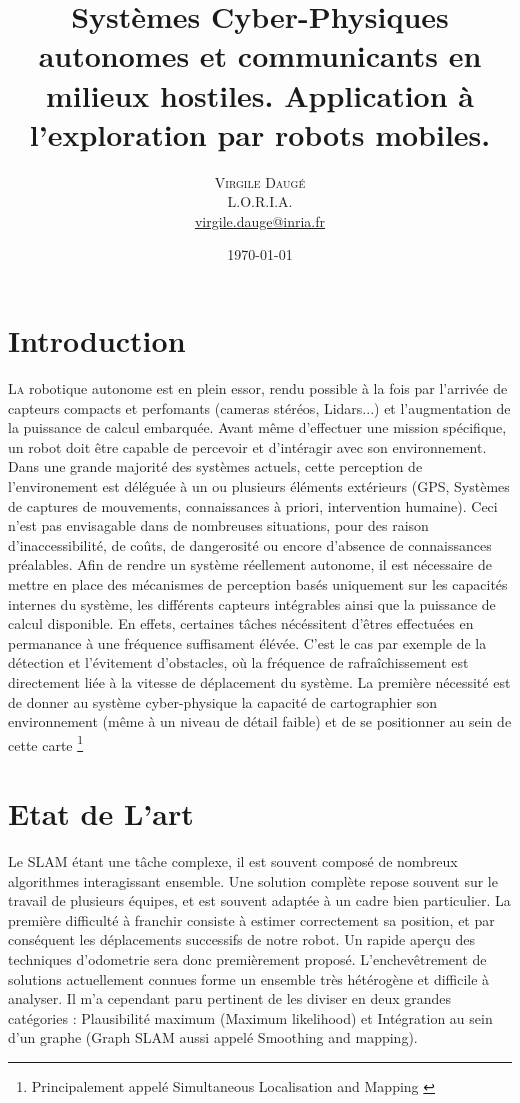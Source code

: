 \documentclass[twoside,twocolumn]{article}
\title{Systèmes Cyber-Physiques autonomes et communicants en milieux hostiles. Application à l’exploration par robots mobiles. } %
\author{%
\textsc{Virgile Daugé} \\[1ex] %
\normalsize L.O.R.I.A. \\ %
\normalsize \href{mailto:virgile.dauge@inria.fr}{virgile.dauge@inria.fr} %
}
\date{\today} %
\begin{document}
\maketitle


\section{Introduction}

\lettrine[nindent=0em,lines=3]{L}a robotique autonome est en plein essor, rendu possible à la fois
par l'arrivée de capteurs compacts et perfomants (cameras stéréos, Lidars...) et l'augmentation de la puissance de calcul embarquée.
Avant même d'effectuer une mission spécifique, un robot doit être capable de percevoir et d'intéragir avec son environnement.
Dans une grande majorité des systèmes actuels, cette perception de l'environement est déléguée à un ou plusieurs éléments extérieurs
(GPS, Systèmes de captures de mouvements, connaissances à priori, intervention humaine). Ceci n'est pas envisagable dans de nombreuses situations,
pour des raison d'inaccessibilité, de coûts, de dangerosité ou encore d'absence de connaissances préalables. Afin de rendre un système réellement autonome,
il est nécessaire de mettre en place des mécanismes de perception basés uniquement sur les capacités internes du système, les différents capteurs intégrables
ainsi que la puissance de calcul disponible. En effets, certaines tâches nécéssitent d'êtres effectuées en permanance à une fréquence suffisament élévée.
C'est le cas par exemple de la détection et l'évitement d'obstacles,
où la fréquence de rafraîchissement est directement liée à la vitesse de déplacement du système.
La première nécessité est de donner au système cyber-physique la capacité de cartographier son environnement
(même à un niveau de détail faible) et de se positionner au sein de cette carte
\footnote{Principalement appelé Simultaneous Localisation and Mapping \cite{durrant-whyte_simultaneous_2006}\cite{bailey_simultaneous_2006}}

\section{Etat de L'art}
Le SLAM étant une tâche complexe, il est souvent composé de nombreux algorithmes interagissant ensemble.
Une solution complète repose souvent sur le travail de plusieurs équipes, et est souvent adaptée à un cadre bien particulier.
La première difficulté à franchir consiste à estimer correctement sa position, et par conséquent les déplacements successifs de notre robot.
Un rapide aperçu des techniques d'odometrie sera donc premièrement proposé.
L'enchevêtrement de solutions actuellement connues forme un ensemble très hétérogène et difficile à analyser.
Il m'a cependant paru pertinent de les diviser en deux grandes catégories : Plausibilité maximum (Maximum likelihood)
et Intégration au sein d'un graphe (Graph SLAM aussi appelé Smoothing and mapping).
\end{document}

